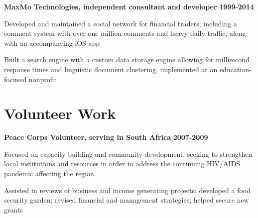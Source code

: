 \bigskip

\noindent
\textbf{MaxMo Technologies, independent consultant and developer} \hfill \textbf{1999-2014}
	
	\begin{list2}
		\item Developed and maintained a social network for financial traders, including a comment system with over one million comments and heavy daily traffic, along with an accompanying iOS app
		\item Built a search engine with a custom data storage engine allowing for millisecond response times and linguistic document clustering, implemented at an education-focused nonprofit
	\end{list2}

\section*{Volunteer Work} 
	
\textbf{Peace Corps Volunteer, serving in South Africa} \hfill \textbf{2007-2009}
	
    \begin{list2}
	    \item Focused on capacity building and community development, seeking to strengthen local institutions and resources in order to address the continuing HIV/AIDS pandemic affecting the region
	    \item Assisted in reviews of business and income generating projects; developed a food security garden; revised financial and management strategies; helped secure new grants
    \end{list2}
        
%    

